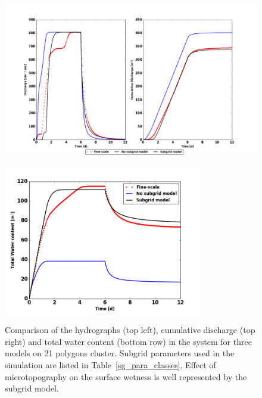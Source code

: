 \documentclass[review,11pt]{elsarticle}
\begin{document}
\begin{figure}[!h]
\hskip -1.6cm  \includegraphics[width=15.cm, height=7.5cm]{./figures/new-model/discharge-Srun5SG_F.png} \\
\includegraphics[width=10.cm, height=6.5cm]{./figures/new-model/Watercontent-Srun5SG_F.png}
\caption{Comparison of the hydrographs (top left), cumulative discharge (top right) and total water content (bottom row) in the system for three models on 21 polygons cluster. Subgrid parameters used in the simulation are listed in Table~\ref{sg_para_classes}. Effect of microtopography on the surface wetness is well represented by the subgrid model.}
\label{lobster-comparison-rainfall}
\end{figure}
\end{document}
